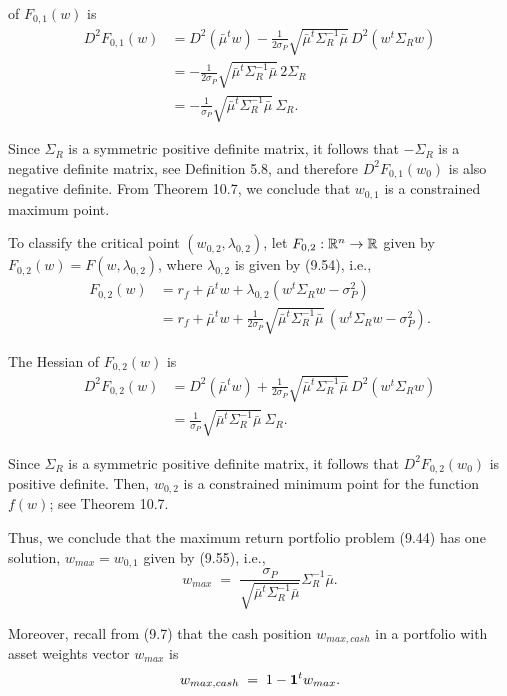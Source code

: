 
of $F_{0,1}(w)$ is
\begin{align*}
D^2F_{0,1}(w) &= D^2(\bar\mu^tw) -
\frac{1}{2\sigma_P}\sqrt{\bar\mu^t\Sigma_R^{-1}\bar\mu}\,D^2(w^t\Sigma_Rw) \\
&= -\frac{1}{2\sigma_P}\sqrt{\bar\mu^t\Sigma_R^{-1}\bar\mu}\,2\Sigma_R \\
&= -\frac{1}{\sigma_P}\sqrt{\bar\mu^t\Sigma_R^{-1}\bar\mu}\,\Sigma_R.
\end{align*}

Since $\Sigma_R$ is a symmetric positive definite matrix, it follows that $-\Sigma_R$
is a negative definite matrix, see Definition 5.8, and therefore $D^2F_{0,1}(w_0)$ is
also negative definite. From Theorem 10.7, we conclude that $w_{0,1}$ is a constrained
maximum point.

To classify the critical point $(w_{0,2},\lambda_{0,2})$, let $F_{0,2}:\mathbb{R}^n\to\mathbb{R}$
given by $F_{0,2}(w)=F(w,\lambda_{0,2})$, where $\lambda_{0,2}$ is given by (9.54),
i.e.,
\begin{align*}
F_{0,2}(w) &= r_f+\bar\mu^tw+\lambda_{0,2}(w^t\Sigma_Rw-\sigma_P^2) \\
&= r_f+\bar\mu^tw+\frac{1}{2\sigma_P}\sqrt{\bar\mu^t\Sigma_R^{-1}\bar\mu}\,
(w^t\Sigma_Rw-\sigma_P^2).
\end{align*}

The Hessian of $F_{0,2}(w)$ is
\begin{align*}
D^2F_{0,2}(w) &= D^2(\bar\mu^tw) +
\frac{1}{2\sigma_P}\sqrt{\bar\mu^t\Sigma_R^{-1}\bar\mu}\,D^2(w^t\Sigma_Rw) \\
&= \frac{1}{\sigma_P}\sqrt{\bar\mu^t\Sigma_R^{-1}\bar\mu}\,\Sigma_R.
\end{align*}

Since $\Sigma_R$ is a symmetric positive definite matrix, it follows that
$D^2F_{0,2}(w_0)$ is positive definite. Then, $w_{0,2}$ is a constrained minimum point
for the function $f(w)$; see Theorem 10.7.

Thus, we conclude that the maximum return portfolio problem (9.44) has one solution,
$w_{max} = w_{0,1}$ given by (9.55), i.e.,
\begin{equation}
w_{max} \;=\; \frac{\sigma_P}{\sqrt{\bar\mu^t\Sigma_R^{-1}\bar\mu}}\Sigma_R^{-1}\bar\mu.
\end{equation}

Moreover, recall from (9.7) that the cash position $w_{max,cash}$ in a portfolio with
asset weights vector $w_{max}$ is
\begin{equation}
w_{max,cash} \;=\; 1-\mathbf{1}^tw_{max}.
\end{equation}

